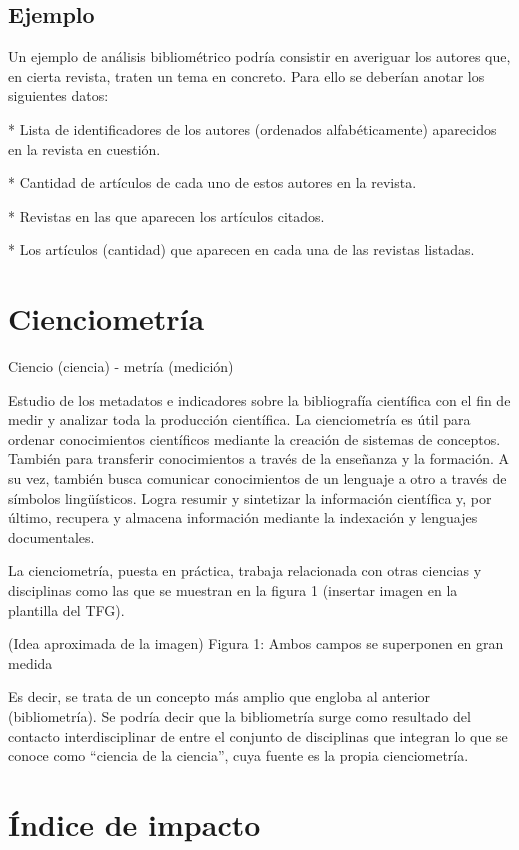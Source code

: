 \subsection{Ejemplo}

Un ejemplo de análisis bibliométrico podría consistir en averiguar los autores que, en cierta revista, traten un tema en concreto. Para ello se deberían anotar los siguientes datos:

* Lista de identificadores de los autores (ordenados alfabéticamente) aparecidos en la revista en cuestión.

* Cantidad de artículos de cada uno de estos autores en la revista.

* Revistas en las que aparecen los artículos citados.

* Los artículos (cantidad) que aparecen en cada una de las revistas listadas.


\section{Cienciometría}

Ciencio (ciencia) - metría (medición)

Estudio de los metadatos e indicadores sobre la bibliografía científica con el fin de medir y analizar toda la producción científica.
La cienciometría es útil para ordenar conocimientos científicos mediante la creación de sistemas de conceptos. También para transferir conocimientos a través de la enseñanza y la formación. A su vez, también busca comunicar conocimientos de un lenguaje a otro a través de símbolos lingüísticos. Logra resumir y sintetizar la información científica y, por último, recupera y almacena información mediante la indexación y lenguajes documentales.

La cienciometría, puesta en práctica, trabaja relacionada con otras ciencias y disciplinas como las que se muestran en la figura 1 (insertar imagen en la plantilla del TFG).

(Idea aproximada de la imagen)
Figura 1: Ambos campos se superponen en gran medida


Es decir, se trata de un concepto más amplio que engloba al anterior (bibliometría). Se podría decir que la bibliometría surge como resultado del contacto interdisciplinar de entre el conjunto de disciplinas que integran lo que se conoce como ``ciencia de la ciencia'', cuya fuente es la propia cienciometría.
 

\section{Índice de impacto}

